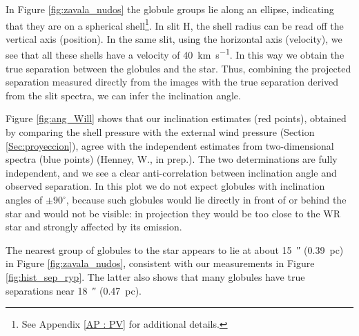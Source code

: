\documentclass{book}
\begin{document}
In Figure \ref{fig:zavala_nudos} the globule groups lie along an
ellipse, indicating that they are on a spherical shell\footnote{See
Appendix \ref{AP : PV} for additional details.}. In slit H, the shell
radius can be read off the vertical axis (position). In the same slit,
using the horizontal axis (velocity), we see that all these shells
have a velocity of \SI{40}{km.s^{-1}}. In this way we obtain the true
separation between the globules and the star. Thus, combining the
projected separation measured directly from the images with the true
separation derived from the slit spectra, we can infer the
inclination angle.

Figure \ref{fig:ang_Will} shows that our inclination estimates (red
points), obtained by comparing the shell pressure with the external
wind pressure (Section \ref{Sec:proyeccion}), agree with the
independent estimates from two-dimensional spectra (blue points)
(Henney, W., in prep.). The two determinations are fully independent,
and we see a clear anti-correlation between inclination angle and
observed separation. In this plot we do not expect globules with
inclination angles of $\pm 90^\circ$, because such globules would lie
directly in front of or behind the star and would not be visible: in
projection they would be too close to the WR star and strongly
affected by its emission.

The nearest group of globules to the star appears to lie at about
\SI{15}{\arcsecond} (\SI{0.39}{pc}) in Figure \ref{fig:zavala_nudos},
consistent with our measurements in Figure \ref{fig:hist_sep_ryp}. The
latter also shows that many globules have true separations near
\SI{18}{\arcsecond} (\SI{0.47}{pc}).
\end{document}
